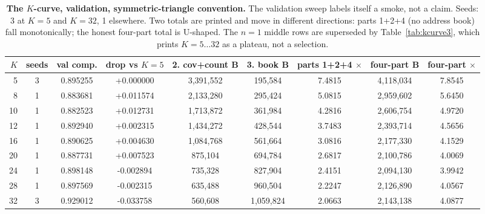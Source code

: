 \documentclass{article} %
\begin{document}
\begin{table}[h]
\centering\small
\caption{\textbf{The $K$-curve, validation, symmetric-triangle convention.} The validation sweep
labels itself a smoke, not a claim. Seeds: 3 at $K=5$ and $K=32$, 1 elsewhere. Two totals are %
printed and move in different directions: parts 1+2+4 (no address book) fall monotonically; the
honest four-part total is U-shaped. The $n=1$ middle rows are superseded by Table~\ref{tab:kcurve3},
which prints $K=5\ldots32$ as a plateau, not a selection. %
}
\label{tab:kcurve}
\setlength{\tabcolsep}{2.4pt}
\begin{adjustbox}{max width=\linewidth}\begin{tabular}{rcccccccc}
\toprule
$K$ & seeds & val comp. & drop vs $K{=}5$ & 2. cov+count B & 3. book B & parts 1+2+4 $\times$ & four-part B & four-part $\times$ \\
\midrule
5 & 3 & 0.895255 & +0.000000 & 3,391,552 & 195,584 & 7.4815 & 4,118,034 & 7.8545 \\
8 & 1 & 0.883681 & +0.011574 & 2,133,280 & 295,424 & 5.0815 & 2,959,602 & 5.6450 \\
10 & 1 & 0.882523 & +0.012731 & 1,713,872 & 361,984 & 4.2816 & 2,606,754 & 4.9720 \\
12 & 1 & 0.892940 & +0.002315 & 1,434,272 & 428,544 & 3.7483 & 2,393,714 & 4.5656 \\
16 & 1 & 0.890625 & +0.004630 & 1,084,768 & 561,664 & 3.0816 & 2,177,330 & 4.1529 \\
20 & 1 & 0.887731 & +0.007523 & 875,104 & 694,784 & 2.6817 & 2,100,786 & 4.0069 \\
24 & 1 & 0.898148 & -0.002894 & 735,328 & 827,904 & 2.4151 & 2,094,130 & 3.9942 \\
28 & 1 & 0.897569 & -0.002315 & 635,488 & 960,504 & 2.2247 & 2,126,890 & 4.0567 \\
32 & 3 & 0.929012 & -0.033758 & 560,608 & 1,059,824 & 2.0663 & 2,143,138 & 4.0877 \\
\bottomrule
\end{tabular}\end{adjustbox}
\end{table}
\end{document}
